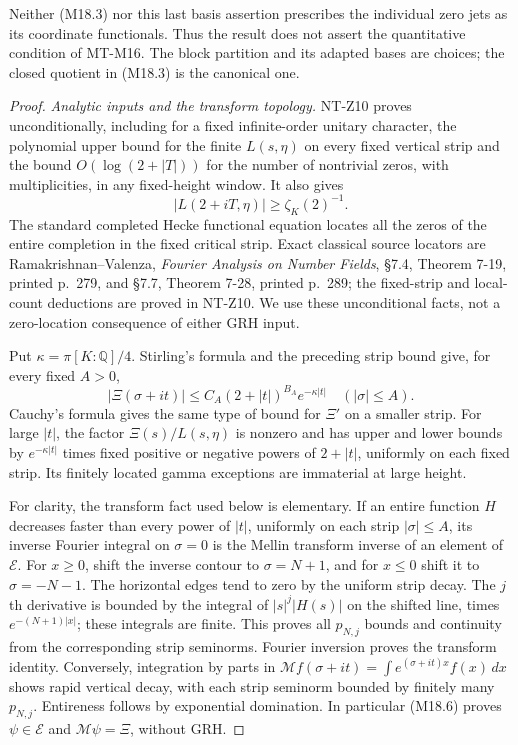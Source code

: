 Neither (M18.3) nor this last basis assertion prescribes the
individual zero jets as its coordinate functionals.  Thus the
result does not assert the quantitative condition of MT-M16.
The block partition and its adapted bases are choices; the
closed quotient in (M18.3) is the canonical one.

\begin{proof}
\emph{Analytic inputs and the transform topology.}
NT-Z10 proves unconditionally, including for a fixed
infinite-order unitary character, the polynomial upper bound
for the finite \(L(s,\eta)\) on every fixed vertical strip and
the bound \(O(\log(2+|T|))\) for the number of nontrivial
zeros, with multiplicities, in any fixed-height window.
It also gives
\[
                   |L(2+iT,\eta)|\ge\zeta_K(2)^{-1}.              \tag{M18.5}
\]
The standard completed Hecke functional equation locates all
the zeros of the entire completion in the fixed critical strip.
Exact classical source locators are Ramakrishnan--Valenza,
\emph{Fourier Analysis on Number Fields}, \S7.4,
Theorem 7-19, printed p.~279, and \S7.7, Theorem 7-28,
printed p.~289; the fixed-strip and local-count deductions
are proved in NT-Z10.  We use these unconditional facts,
not a zero-location consequence of either GRH input.

Put \(\kappa=\pi[K:\mathbb Q]/4\).  Stirling's formula and
the preceding strip bound give, for every fixed \(A>0\),
\[
 |\Xi(\sigma+it)|\le C_A(2+|t|)^{B_A}e^{-\kappa|t|}
                         \quad(|\sigma|\le A).                  \tag{M18.6}
\]
Cauchy's formula gives the same type of bound for \(\Xi'\)
on a smaller strip.  For large \(|t|\), the factor
\(\Xi(s)/L(s,\eta)\) is nonzero and has upper and lower
bounds by \(e^{-\kappa|t|}\) times fixed positive or negative
powers of \(2+|t|\), uniformly on each fixed strip.  Its
finitely located gamma exceptions are immaterial at large
height.

For clarity, the transform fact used below is elementary.
If an entire function \(H\) decreases faster than every
power of \(|t|\), uniformly on each strip \(|\sigma|\le A\),
its inverse Fourier integral on \(\sigma=0\) is the Mellin
transform inverse of an element of \(\mathcal E\).
For \(x\ge0\), shift the inverse contour to
\(\sigma=N+1\), and for \(x\le0\) shift it to
\(\sigma=-N-1\).  The horizontal edges tend to zero by the
uniform strip decay.  The \(j\)th derivative is bounded
by the integral of \(|s|^j|H(s)|\) on the shifted line,
times \(e^{-(N+1)|x|}\); these integrals are finite.
This proves all \(p_{N,j}\) bounds and continuity from the
corresponding strip seminorms.  Fourier inversion proves
the transform identity.  Conversely, integration by parts
in \(\mathcal Mf(\sigma+it)=\int e^{(\sigma+it)x}f(x)\,dx\)
shows rapid vertical decay, with each strip seminorm
bounded by finitely many \(p_{N,j}\).  Entireness follows
by exponential domination.  In particular (M18.6) proves
\(\psi\in\mathcal E\) and \(\mathcal M\psi=\Xi\), without GRH.


\end{proof}
